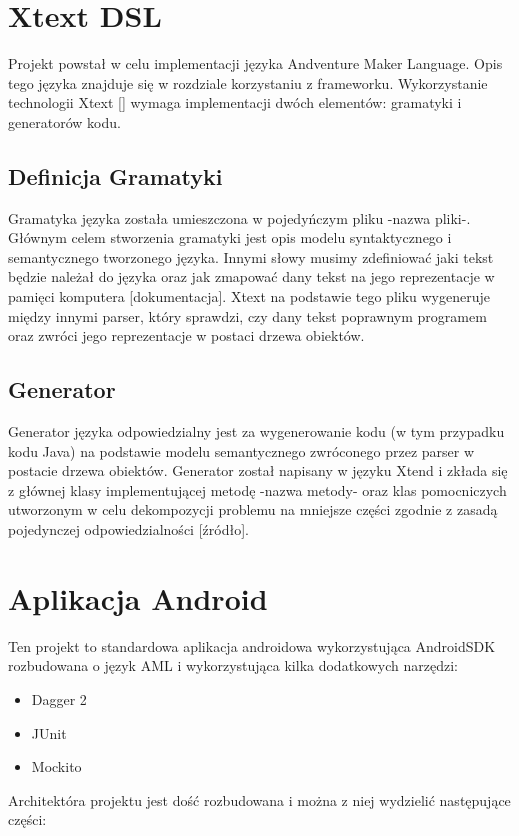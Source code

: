 \documentclass	{xmgr}
\begin{document}
\section{Xtext DSL} 
Projekt powstał w celu implementacji języka Andventure Maker Language. Opis tego języka znajduje się w rozdziale korzystaniu z frameworku.
Wykorzystanie technologii Xtext [] wymaga implementacji dwóch elementów: gramatyki i generatorów kodu. 

\subsection{Definicja Gramatyki} 
Gramatyka języka została umieszczona w pojedyńczym pliku -nazwa pliki-. Głównym celem stworzenia gramatyki jest opis modelu syntaktycznego i semantycznego tworzonego języka. Innymi słowy musimy zdefiniować jaki tekst będzie należał do języka oraz jak zmapować dany tekst na jego reprezentacje w pamięci komputera [dokumentacja]. Xtext na podstawie tego pliku wygeneruje między innymi parser, który sprawdzi, czy dany tekst poprawnym programem oraz zwróci jego reprezentacje w postaci drzewa obiektów.

\subsection{Generator}
Generator języka odpowiedzialny jest za wygenerowanie kodu (w tym przypadku kodu Java) na podstawie modelu semantycznego zwróconego przez parser w postacie drzewa obiektów. Generator został napisany w języku Xtend i zkłada się z głównej klasy implementującej metodę -nazwa metody- oraz klas pomocniczych utworzonym w celu dekompozycji problemu na mniejsze części zgodnie z zasadą pojedynczej odpowiedzialności [źródło].

\section{Aplikacja Android}
Ten projekt to standardowa aplikacja androidowa wykorzystująca AndroidSDK rozbudowana o język AML i wykorzystująca kilka dodatkowych narzędzi:
\begin{itemize}
	\item Dagger 2
	\item JUnit
	\item Mockito
\end{itemize}

Architektóra projektu jest dość rozbudowana i można z niej wydzielić następujące części:
\end{document}
